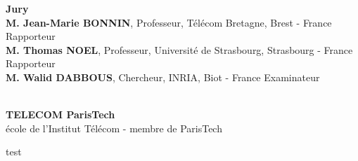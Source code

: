 %
%
%
\vfill
%
%
%
\flushleft
\begin{minipage}{.9\textwidth}	%
{\bf Jury}\\
{\bf M. Jean-Marie BONNIN}, {\small Professeur, Télécom Bretagne, Brest - France}
	\hfill Rapporteur\\
{\bf M. Thomas NOEL}, {\small Professeur, Université de Strasbourg, Strasbourg - France}
	\hfill Rapporteur\\
	{\bf M. Walid DABBOUS}, {\small Chercheur, INRIA, Biot - France}
	\hfill Examinateur\\
\end{minipage}\\
%
%
%
\vspace{-.3cm}
%
%
%
\centering
{\bf TELECOM ParisTech}\\
{\small école de l'Institut Télécom - membre de ParisTech}

test 
%
%
%
%
